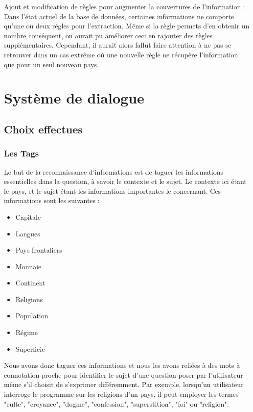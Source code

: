 \documentclass[11pt,a4paper]{article}
\begin{document}
	
Ajout et modification de règles pour augmenter la couvertures de l'information :
Dans l'état actuel de la base de données, certaines informations ne comporte qu'une ou deux règles pour l'extraction.
Même si la règle permets d'en obtenir un nombre conséquent, on aurait pu améliorer ceci en rajouter des règles supplémentaires.
Cependant, il aurait alors fallut faire attention à ne pas se retrouver dans un cas extrême où une nouvelle règle ne récupère l'information que pour un seul nouveau pays.

\clearpage

\section{Système de dialogue}

\subsection{Choix effectues}

\subsubsection{Les Tags} 

Le but de la reconnaissance d’informations est de taguer les informations essentielles dans la question, à savoir le contexte et le sujet. Le contexte ici étant le pays, et le sujet étant les informations importantes le concernant. Ces informations sont les suivantes :
\begin{itemize}
	\item Capitale
	\item Langues
	\item Pays frontaliers
	\item Monnaie
	\item Continent
	\item Religions
	\item Population
	\item Régime
	\item Superficie
\end{itemize}

Nous avons donc taguer ces informations et nous les avons reliées à des mots à connotation proche pour identifier le sujet d'une question poser par l'utilisateur même s'il choisit de s'exprimer différemment. Par exemple, lorsqu'un utilisateur interroge le programme sur les religions d'un pays, il peut employer les termes "culte", "croyance", "dogme", "confession", "superstition", "foi" ou "religion".
\end{document}
